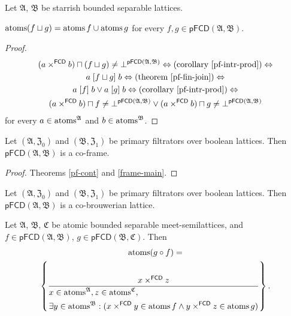 \begin{prop}
Let $\mathfrak{A}$, $\mathfrak{B}$ be starrish bounded separable lattices.

$\operatorname{atoms}(f\sqcup g)=\operatorname{atoms} f\cup\operatorname{atoms} g$ for every $f,g\in\mathsf{pFCD}(\mathfrak{A},\mathfrak{B})$.\end{prop}
\begin{proof}
~
\begin{multline*}
(a\times^{\mathsf{FCD}}b)\sqcap(f\sqcup g)\neq\bot^{\mathsf{pFCD}(\mathfrak{A},\mathfrak{B})}
\Leftrightarrow \text{(corollary~\ref{pf-intr-prod})} \Leftrightarrow \\
a\mathrel{\left[f\sqcup g\right]}b\Leftrightarrow \text{(theorem~\ref{pf-fin-join})} \Leftrightarrow \\ a\mathrel{\left[f\right]}b\vee a\mathrel{\left[g\right]}b
\Leftrightarrow \text{(corollary~\ref{pf-intr-prod})} \Leftrightarrow \\
(a\times^{\mathsf{FCD}}b)\sqcap f\neq\bot^{\mathsf{pFCD}(\mathfrak{A},\mathfrak{B})}\vee(a\times^{\mathsf{FCD}}b)\sqcap g\neq\bot^{\mathsf{pFCD}(\mathfrak{A},\mathfrak{B})}
\end{multline*}
for every $a\in\operatorname{atoms}^{\mathfrak{A}}$ and $b\in\operatorname{atoms}^{\mathfrak{B}}$.\end{proof}
\begin{thm}
Let $(\mathfrak{A},\mathfrak{Z}_{0})$ and $(\mathfrak{B},\mathfrak{Z}_{1})$
be primary filtrators over boolean lattices. Then $\mathsf{pFCD}(\mathfrak{A},\mathfrak{B})$
is a co-frame.\end{thm}
\begin{proof}
Theorems \ref{pf-cont} and \ref{frame-main}.\end{proof}
\begin{cor}
Let $(\mathfrak{A},\mathfrak{Z}_{0})$ and $(\mathfrak{B},\mathfrak{Z}_{1})$
be primary filtrators over boolean lattices. Then $\mathsf{pFCD}(\mathfrak{A},\mathfrak{B})$
is a co-brouwerian lattice.\end{cor}
\begin{prop}
Let $\mathfrak{A}$, $\mathfrak{B}$, $\mathfrak{C}$ be atomic bounded separable meet-semilattices,
and $f\in\mathsf{pFCD}(\mathfrak{A},\mathfrak{B})$,
$g\in\mathsf{pFCD}(\mathfrak{B},\mathfrak{C})$. Then
\begin{multline*}
\operatorname{atoms}(g\circ f)=\\
\left\{ \frac{x\times^{\mathsf{FCD}}z}{
\begin{aligned}
&x\in\operatorname{atoms}^{\mathfrak{A}},z\in\operatorname{atoms}^{\mathfrak{C}},\\
&\exists y\in\operatorname{atoms}^{\mathfrak{B}}:
(x\times^{\mathsf{FCD}}y\in\operatorname{atoms} f\land y\times^{\mathsf{FCD}}z\in\operatorname{atoms} g)
\end{aligned}
}\right\}.
\end{multline*}
\end{prop}
